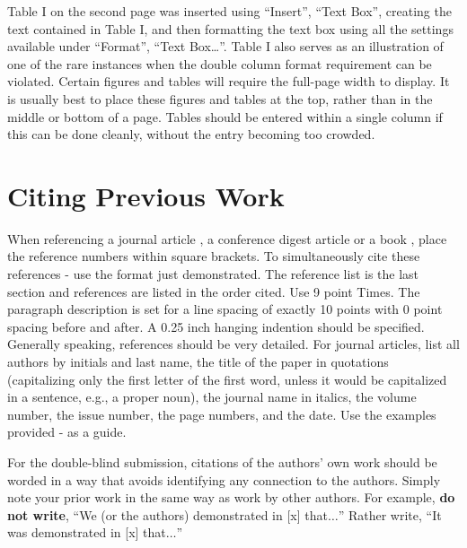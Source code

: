\documentclass[conference]{IEEEtran}
\begin{document}
{Table I on the second page was inserted using ``Insert'', ``Text
Box'', creating the text contained in Table I, and then formatting the
text box using all the settings available under ``Format'', ``Text
Box\dots ''. Table I also serves as an illustration of one of the rare
instances when the double column format requirement can be
violated. Certain figures and tables will require the full-page width
to display. It is usually best to place these figures and tables at
the top, rather than in the middle or bottom of a page. Tables should be entered within a single column if this can be done cleanly, without the entry becoming too crowded.

\section{Citing Previous Work}
When referencing a journal article \cite{cantrell1}, a conference
digest article \cite{cantrell2} or a book \cite{krauss}, place the reference numbers within square
brackets. To simultaneously cite these references \cite{cantrell1} - \cite{krauss} use the format just demonstrated. The reference list is the last section and references are listed in the order cited. Use 9 point Times. The paragraph description is set for a line spacing of exactly 10 points with 0 point spacing before and after. A 0.25 inch hanging indention should be specified. 
Generally speaking, references should be very detailed. For journal
articles, list all authors by initials and last name, the title of the
paper in quotations (capitalizing only the first letter of the first
word, unless it would be capitalized in a sentence, e.g., a proper
noun), the journal name in italics, the volume number, the issue
number, the page numbers, and the date. Use the examples provided
\cite{cantrell1} - \cite{krauss} as a guide. 

For the double-blind submission, citations of the authors' own work should be worded in a way that avoids identifying any connection to the authors. Simply note your prior work in the same way as work by other authors. For example, {\bfseries do not write}, ``We (or the authors) demonstrated in [x] that$\ldots$'' Rather write, ``It was demonstrated in [x] that$\ldots$''

\vfil\eject

}
\end{document}
